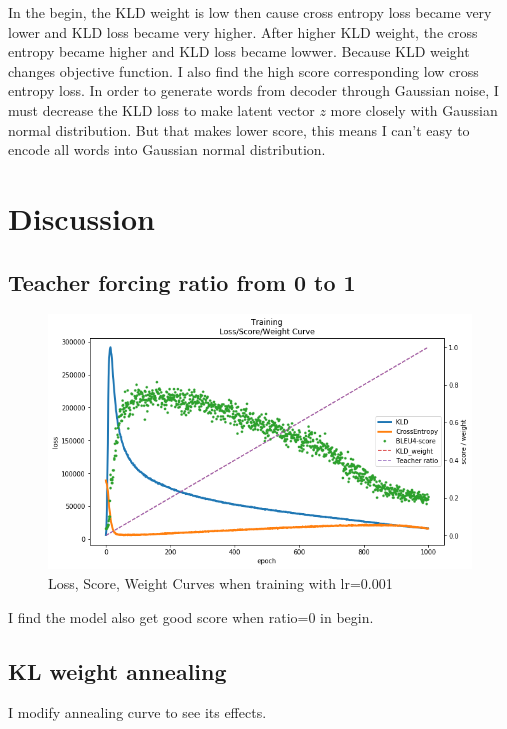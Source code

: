 \documentclass[12pt]{article}
\begin{document}
In the begin, the KLD weight is low then cause cross entropy loss became very lower and KLD loss became very higher. After higher KLD weight, the cross entropy became higher and KLD loss became lowwer. Because KLD weight changes objective function. I also find the high score corresponding low cross entropy loss. In order to generate words from decoder through Gaussian noise, I must decrease the KLD loss to make latent vector $z$ more closely with Gaussian normal distribution. But that makes lower score, this means I can't easy to encode all words into Gaussian normal distribution.

\section{Discussion}

\subsection{Teacher forcing ratio from 0 to 1}

\begin{figure}[H]
\centering
\includegraphics[width=\linewidth]{Images/curves.png} 
\caption{Loss, Score, Weight Curves when training with lr=0.001}
\end{figure}

I find the model also get good score when ratio=0 in begin.

\subsection{KL weight annealing}

I modify annealing curve to see its effects.
\end{document}
